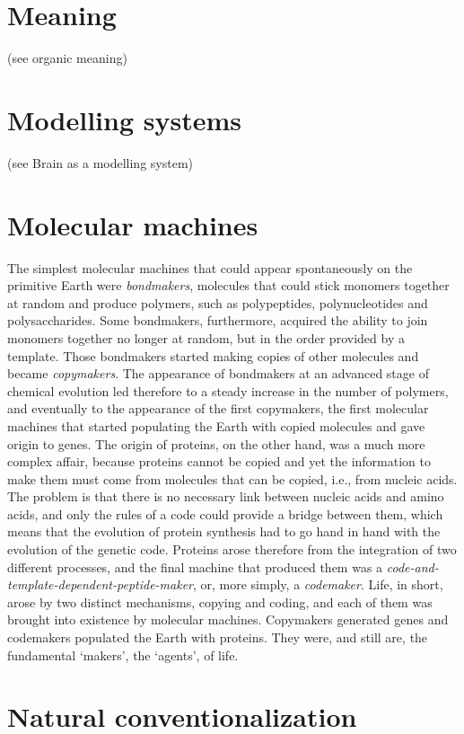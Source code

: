 \documentclass[12pt]{article}
\begin{document}
\section{Meaning} (see organic meaning)


\section{Modelling systems} (see Brain as a modelling system)
 

\section{Molecular machines}
The simplest molecular machines that could appear spontaneously on the primitive Earth were \textit{bondmakers}, molecules that could stick monomers together at random and produce polymers, such as polypeptides, polynucleotides and polysaccharides. Some bondmakers, furthermore, acquired the ability to join monomers together no longer at random, but in the order provided by a template. Those bondmakers started making copies of other molecules and became \textit{copymakers}. The appearance of bondmakers at an advanced stage of chemical evolution led therefore to a steady increase in the number of polymers, and eventually to the appearance of the first copymakers, the first molecular machines that started populating the Earth with copied molecules and gave origin to genes. The origin of proteins, on the other hand, was a much more complex affair, because proteins cannot be copied and yet the information to make them must come from molecules that can be copied, i.e., from nucleic acids. The problem is that there is no necessary link between nucleic acids and amino acids, and only the rules of a code could provide a bridge between them, which means that the evolution of protein synthesis had to go hand in hand with the evolution of the genetic code. Proteins arose therefore from the integration of two different processes, and the final machine that produced them was a \textit{code-and-template-dependent-peptide-maker}, or, more simply, a \textit{codemaker}. Life, in short, arose by two distinct mechanisms, copying and coding, and each of them was brought into existence by molecular machines. Copymakers generated genes and codemakers populated the Earth with proteins. They were, and still are, the fundamental `makers', the `agents', of life.


\hypertarget{natural_conventionalization}{}
\section{Natural conventionalization}
\end{document}
